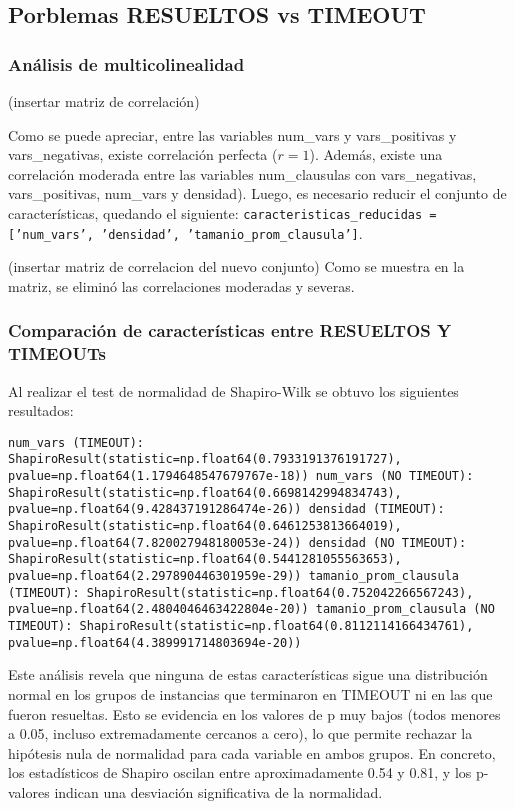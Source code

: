 \subsection{Porblemas RESUELTOS vs TIMEOUT}

\subsubsection{An\'alisis de multicolinealidad}

(insertar matriz de correlaci\'on)

Como se puede apreciar, entre las variables num\_vars y vars\_positivas y vars\_negativas, existe correlaci\'on perfecta ($r=1$). Adem\'as, existe una correlaci\'on moderada entre las variables num\_clausulas con vars\_negativas, vars\_positivas, num\_vars y densidad). Luego, es necesario reducir el conjunto de caracter\'isticas, quedando  el siguiente: \texttt{caracteristicas\_reducidas = ['num\_vars', 'densidad', 'tamanio\_prom\_clausula']}.

(insertar matriz de correlacion del nuevo conjunto)
Como se muestra en la matriz, se elimin\'o las correlaciones moderadas y severas.

\subsubsection{Comparaci\'on de caracter\'isticas entre RESUELTOS Y TIMEOUTs}

Al realizar el test de normalidad de Shapiro-Wilk se obtuvo los siguientes resultados:

\texttt{num\_vars (TIMEOUT): ShapiroResult(statistic=np.float64(0.7933191376191727), pvalue=np.float64(1.1794648547679767e-18))
num\_vars (NO TIMEOUT): ShapiroResult(statistic=np.float64(0.6698142994834743), pvalue=np.float64(9.428437191286474e-26))
densidad (TIMEOUT): ShapiroResult(statistic=np.float64(0.6461253813664019), pvalue=np.float64(7.820027948180053e-24))
densidad (NO TIMEOUT): ShapiroResult(statistic=np.float64(0.5441281055563653), pvalue=np.float64(2.297890446301959e-29))
tamanio\_prom\_clausula (TIMEOUT): ShapiroResult(statistic=np.float64(0.752042266567243), pvalue=np.float64(2.4804046463422804e-20))
tamanio\_prom\_clausula (NO TIMEOUT): ShapiroResult(statistic=np.float64(0.8112114166434761), pvalue=np.float64(4.389991714803694e-20))}

Este an\'alisis revela que ninguna de estas características sigue una distribución normal en los grupos de instancias que terminaron en TIMEOUT ni en las que fueron resueltas. Esto se evidencia en los valores de p muy bajos (todos menores a 0.05, incluso extremadamente cercanos a cero), lo que permite rechazar la hipótesis nula de normalidad para cada variable en ambos grupos. En concreto, los estadísticos de Shapiro oscilan entre aproximadamente 0.54 y 0.81, y los p-valores indican una desviación significativa de la normalidad.

